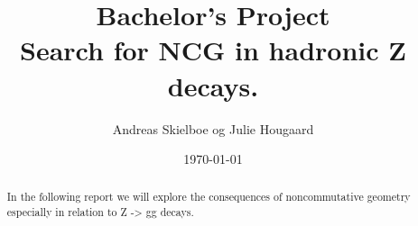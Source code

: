 \documentclass[11pt,a4paper,titlepage]{article}
\numberwithin{equation}{section}
\begin{document}
\title{Bachelor's Project\\Search for NCG in hadronic Z decays.}
\author{Andreas Skielboe og Julie Hougaard}
\date{\today}
\maketitle
{}

\begin{abstract}
In the following report we will explore the consequences of noncommutative geometry especially in relation to Z -> gg decays.
\end{abstract}

\clearpage
\tableofcontents
\clearpage







%













\clearpage





\clearpage







\end{document}
